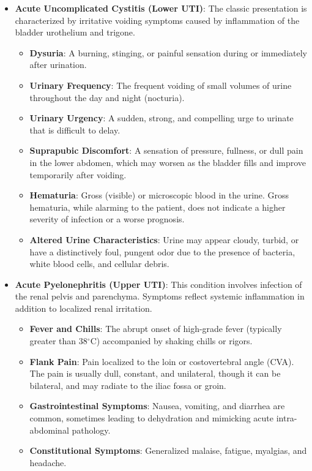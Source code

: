\begin{itemize}
    \item \textbf{Acute Uncomplicated Cystitis (Lower UTI)}: The classic presentation is characterized by irritative voiding symptoms caused by inflammation of the bladder urothelium and trigone.
    \begin{itemize}
        \item \textbf{Dysuria}: A burning, stinging, or painful sensation during or immediately after urination.
        \item \textbf{Urinary Frequency}: The frequent voiding of small volumes of urine throughout the day and night (nocturia).
        \item \textbf{Urinary Urgency}: A sudden, strong, and compelling urge to urinate that is difficult to delay.
        \item \textbf{Suprapubic Discomfort}: A sensation of pressure, fullness, or dull pain in the lower abdomen, which may worsen as the bladder fills and improve temporarily after voiding.
        \item \textbf{Hematuria}: Gross (visible) or microscopic blood in the urine. Gross hematuria, while alarming to the patient, does not indicate a higher severity of infection or a worse prognosis.
        \item \textbf{Altered Urine Characteristics}: Urine may appear cloudy, turbid, or have a distinctively foul, pungent odor due to the presence of bacteria, white blood cells, and cellular debris.
    \end{itemize}
    \item \textbf{Acute Pyelonephritis (Upper UTI)}: This condition involves infection of the renal pelvis and parenchyma. Symptoms reflect systemic inflammation in addition to localized renal irritation.
    \begin{itemize}
        \item \textbf{Fever and Chills}: The abrupt onset of high-grade fever (typically greater than 38$^\circ$C) accompanied by shaking chills or rigors.
        \item \textbf{Flank Pain}: Pain localized to the loin or costovertebral angle (CVA). The pain is usually dull, constant, and unilateral, though it can be bilateral, and may radiate to the iliac fossa or groin.
        \item \textbf{Gastrointestinal Symptoms}: Nausea, vomiting, and diarrhea are common, sometimes leading to dehydration and mimicking acute intra-abdominal pathology.
        \item \textbf{Constitutional Symptoms}: Generalized malaise, fatigue, myalgias, and headache.

\end{itemize}
\end{itemize}
